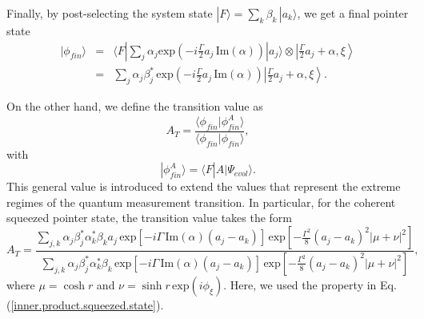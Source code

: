 \documentclass[aps,pra,preprint,superscriptaddress, showpacs]{revtex4-2}
\begin{document}
Finally, by post-selecting the system state $|F\rangle=\sum_{k}\beta_{k}\, |a_{k}\rangle$, we get a final pointer state
\begin{eqnarray}\label{final.pointer}
|\phi_{fin}\rangle&=&\langle F|\sum_{j}\alpha_{j}\textrm{exp}\left(-i \frac{\Gamma}{2}a_{j}\,\textrm{Im}(\alpha)\right)|a_{j}\rangle\otimes\left|\frac{\Gamma}{2}a_{j}+\alpha, \xi\right\rangle \nonumber\\
&=&\sum_{j} \alpha_{j}\beta_{j}^{*}\,\textrm{exp}\left(-i \frac{\Gamma}{2}a_{j}\,\textrm{Im}(\alpha)\right)\left|\frac{\Gamma}{2}a_{j}+\alpha, \xi\right\rangle.
\end{eqnarray}

On the other hand, we define the transition value as 
\begin{equation}\label{transition.value}
A_{T}=\frac{\langle \phi_{fin}|\phi_{fin}^{A}\rangle}{\langle \phi_{fin}|\phi_{fin} \rangle},
\end{equation}
with
\begin{equation}
|\phi_{fin}^{A}\rangle=\langle F|A|\Psi_{evol}\rangle.
\end{equation}
This general value is introduced to extend the values that represent the extreme regimes of the quantum measurement transition. In particular, for the coherent squeezed pointer state, the transition value takes the form
\begin{equation}\label{transition.value.squezeed.state}
A_{T}=\frac{\sum_{j,k}\alpha_{j}\beta_{j}^{*}\alpha_{k}^{*}\beta_{k}a_{j}\,\textrm{exp}\left[-i\Gamma\,\textrm{Im}(\alpha)\left(a_{j}-a_{k}\right)\right]\,\textrm{exp}\left[-\frac{\Gamma^{2}}{8}\left(a_{j}-a_{k}\right)^{2}|\mu+\nu|^2\right]}{\sum_{j,k}\alpha_{j}\beta_{j}^{*}\alpha_{k}^{*}\beta_{k}\,\textrm{exp}\left[-i\Gamma\,\textrm{Im}(\alpha)\left(a_{j}-a_{k}\right)\right]\,\textrm{exp}\left[-\frac{\Gamma^{2}}{8}\left(a_{j}-a_{k}\right)^{2}|\mu+\nu|^2\right]},
\end{equation}
where $\mu=\cosh{r}$ and $\nu=\sinh{r}\,\textrm{exp}(i\phi_{\xi})$. Here, we used the property in Eq. (\ref{inner.product.squeezed.state}).
\end{document}

